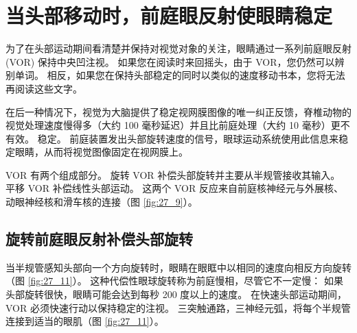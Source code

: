 \section{当头部移动时，前庭眼反射使眼睛稳定}

为了在头部运动期间看清楚并保持对视觉对象的关注，眼睛通过一系列前庭眼反射 (VOR) 保持中央凹注视。
如果您在阅读时来回摇头，由于 VOR，您仍然可以辨别单词。
相反，如果您在保持头部稳定的同时以类似的速度移动书本，您将无法再阅读这些文字。


在后一种情况下，视觉为大脑提供了稳定视网膜图像的唯一纠正反馈，脊椎动物的视觉处理速度慢得多（大约 100 毫秒延迟）并且比前庭处理（大约 10 毫秒）更不有效。 稳定。
前庭装置发出头部旋转速度的信号，眼球运动系统使用此信息来稳定眼睛，从而将视觉图像固定在视网膜上。


VOR 有两个组成部分。
旋转 VOR 补偿头部旋转并主要从半规管接收其输入。
平移 VOR 补偿线性头部运动。
这两个 VOR 反应来自前庭核神经元与外展核、动眼神经核和滑车核的连接（图 \ref{fig:27_9}）。


\subsection{旋转前庭眼反射补偿头部旋转}

当半规管感知头部向一个方向旋转时，眼睛在眼眶中以相同的速度向相反方向旋转（图 \ref{fig:27_11}）。 
这种代偿性眼球旋转称为前庭慢相，尽管它不一定慢：
如果头部旋转很快，眼睛可能会达到每秒 200 度以上的速度。 
在快速头部运动期间，VOR 必须快速行动以保持稳定的注视。 
三突触通路，三神经元弧，将每个半规管连接到适当的眼肌（图 \ref{fig:27_11}）。



